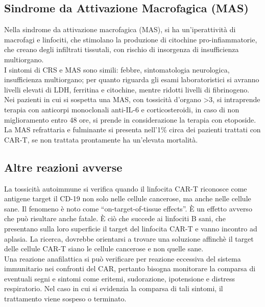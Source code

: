 \subsection{Sindrome da Attivazione Macrofagica (MAS)}

Nella sindrome da attivazione macrofagica (MAS), si ha un’iperattività di macrofagi e linfociti, che stimolano la 
produzione di citochine pro-infiammatorie, che creano degli infiltrati tissutali, con rischio di insorgenza di 
insufficienza multiorgano.\\
I sintomi di CRS e MAS sono simili: febbre, sintomatologia neurologica, insufficienza multiorgano; 
per quanto riguarda gli esami laboratoristici si avranno livelli elevati di LDH, ferritina e citochine, mentre 
ridotti livelli di fibrinogeno\cite{EMATOCART}.
Nei pazienti in cui si sospetta una MAS, con tossicità d’organo >3, si intraprende terapia con anticorpi monoclonali 
anti-IL-6 e corticosteroidi, in caso di non miglioramento entro 48 ore, 
si prende in considerazione la terapia con etoposide.\\
La MAS refrattaria e fulminante si presenta nell’1\% circa dei pazienti trattati con CAR-T, 
se non trattata prontamente ha un’elevata mortalità\cite{EMATOCART}.\\

\subsection{Altre reazioni avverse}

La tossicità autoimmune si verifica quando il linfocita CAR-T riconosce come antigene target il CD-19 non solo nelle 
cellule cancerose, ma anche nelle cellule sane.
Il fenomeno è noto come “on-target-of-tissue effects”. È un effetto avverso che può risultare anche fatale.
È ciò che succede ai linfociti B sani, che presentano sulla loro superficie il target del linfocita CAR-T e vanno 
incontro ad aplasia. La ricerca, dovrebbe orientarsi a trovare una soluzione affinchè il target delle cellule CAR-T 
siano le cellule cancerose e non quelle sane\cite{Frontiers}.\\

Una reazione anafilattica si può verificare per reazione eccessiva del sistema immunitario nei confronti del CAR, 
pertanto bisogna monitorare la comparsa di eventuali segni e sintomi come eritemi, 
sudorazione, ipotensione e distress respiratorio\cite{EMATOCART}.
Nel caso in cui si evidenzia la comparsa di tali sintomi, il trattamento viene sospeso o terminato\cite{Frontiers}.\\

